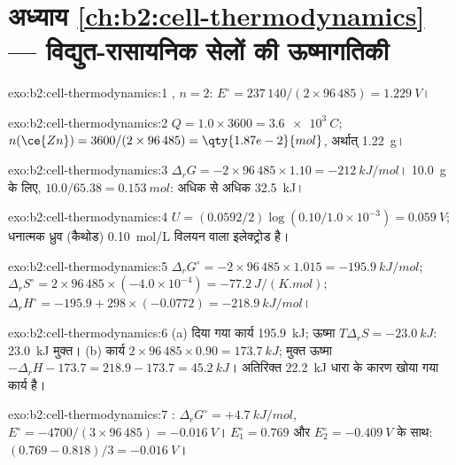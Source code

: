 \section*{अध्याय \ref{ch:b2:cell-thermodynamics} --- विद्युत-रासायनिक सेलों की ऊष्मागतिकी}

\begin{solution}{exo:b2:cell-thermodynamics:1}
, $n = 2$: $E^\circ = 237\,140/(2 \times 96\,485) =
\qty{1.229}{V}$।
\end{solution}

\begin{solution}{exo:b2:cell-thermodynamics:2}
$Q = 1.0 \times 3600 = \qty{3.6e3}{C}$; $n(\ce{Zn}) = 3600/(2 \times 96\,485) =
\qty{1.87e-2}{mol}$, अर्थात् \qty{1.22}{g}।
\end{solution}

\begin{solution}{exo:b2:cell-thermodynamics:3}
$\Delta_r G = -2 \times 96\,485 \times 1.10 = \qty{-212}{kJ/mol}$।
\qty{10.0}{g} के लिए, $10.0/65.38 = \qty{0.153}{mol}$: अधिक से अधिक \qty{32.5}{kJ}।
\end{solution}

\begin{solution}{exo:b2:cell-thermodynamics:4}
$U = (0.0592/2)\log(0.10/1.0 \times 10^{-3}) = \qty{0.059}{V}$; धनात्मक ध्रुव
(कैथोड) \qty{0.10}{mol/L} विलयन वाला इलेक्ट्रोड है।
\end{solution}

\begin{solution}{exo:b2:cell-thermodynamics:5}
$\Delta_r G^\circ = -2 \times 96\,485 \times 1.015 = \qty{-195.9}{kJ/mol}$;
$\Delta_r S^\circ = 2 \times 96\,485 \times (-4.0 \times 10^{-4}) =
\qty{-77.2}{J/(K.mol)}$; $\Delta_r H^\circ = -195.9 + 298 \times (-0.0772) =
\qty{-218.9}{kJ/mol}$।
\end{solution}

\begin{solution}{exo:b2:cell-thermodynamics:6}
(a) दिया गया कार्य \qty{195.9}{kJ}; ऊष्मा $T\Delta_r S = \qty{-23.0}{kJ}$: \qty{23.0}{kJ}
मुक्त। (b) कार्य $2 \times 96\,485 \times 0.90 = \qty{173.7}{kJ}$; मुक्त ऊष्मा
$-\Delta_r H - 173.7 = 218.9 - 173.7 = \qty{45.2}{kJ}$। अतिरिक्त
\qty{22.2}{kJ} धारा के कारण खोया गया कार्य है।
\end{solution}

\begin{solution}{exo:b2:cell-thermodynamics:7}
: $\Delta_r G^\circ = +\qty{4.7}{kJ/mol}$, $E^\circ =
-4700/(3 \times 96\,485) = \qty{-0.016}{V}$। $E_1^\circ = 0.769$ और
$E_2^\circ = \qty{-0.409}{V}$ के साथ: $(0.769 - 0.818)/3 = \qty{-0.016}{V}$।
\end{solution}

